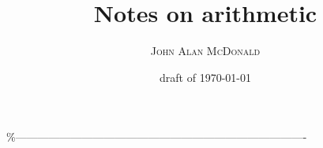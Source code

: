 \documentclass[10pt,openany]{book}
\title{Notes on arithmetic}
\author{\textsc{John Alan McDonald}}
\date{draft of \today}
\begin{document}
\maketitle


% 

\setcounter{baseSectionLevel}{6}
\setcounter{currentlevel}{\value{baseSectionLevel}}




\%-------------------------------------------------------------------------------
\pagebreak
\appendix

\backmatter



\end{document}
